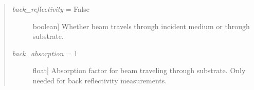 \documentclass[letterpaper,10pt,english]{sphinxmanual}
\begin{document}
\begin{fulllineitems}
\begin{fulllineitems}
\begin{quote}
\begin{description}
\begin{description}
\item[{\emph{back\_reflectivity} = False}] \leavevmode{[}boolean{]}
Whether beam travels through incident medium
or through substrate.

\item[{\emph{back\_absorption} = 1}] \leavevmode{[}float{]}
Absorption factor for beam traveling through substrate.
Only needed for back reflectivity measurements.

\end{description}

\end{description}\end{quote}

\end{fulllineitems}


\end{fulllineitems}

\end{document}
